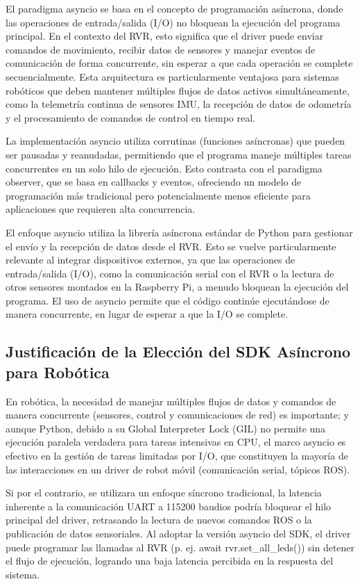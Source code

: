 \documentclass[11pt]{article}
\numberwithin{figure}{section}
\numberwithin{table}{section}
\begin{document}
El paradigma asyncio se basa en el concepto de programación asíncrona, donde las operaciones de entrada/salida (I/O) no bloquean la ejecución del programa principal. En el contexto del RVR, esto significa que el driver puede enviar comandos de movimiento, recibir datos de sensores y manejar eventos de comunicación de forma concurrente, sin esperar a que cada operación se complete secuencialmente. Esta arquitectura es particularmente ventajosa para sistemas robóticos que deben mantener múltiples flujos de datos activos simultáneamente, como la telemetría continua de sensores IMU, la recepción de datos de odometría y el procesamiento de comandos de control en tiempo real.

La implementación asyncio utiliza corrutinas (funciones asíncronas) que pueden ser pausadas y reanudadas, permitiendo que el programa maneje múltiples tareas concurrentes en un solo hilo de ejecución. Esto contrasta con el paradigma observer, que se basa en callbacks y eventos, ofreciendo un modelo de programación más tradicional pero potencialmente menos eficiente para aplicaciones que requieren alta concurrencia.

El enfoque asyncio utiliza la librería asíncrona estándar de Python para gestionar el envío y la recepción de datos desde el RVR. Esto se vuelve particularmente relevante al integrar dispositivos externos, ya que las operaciones de entrada/salida (I/O), como la comunicación serial con el RVR o la lectura de otros sensores montados en la Raspberry Pi, a menudo bloquean la ejecución del programa. El uso de asyncio permite que el código continúe ejecutándose de manera concurrente, en lugar de esperar a que la I/O se complete.


\subsection{Justificación de la Elección del SDK Asíncrono para Robótica}

En robótica, la necesidad de manejar múltiples flujos de datos y comandos de manera concurrente (sensores, control y comunicaciones de red) es importante; y aunque Python, debido a su Global Interpreter Lock (GIL) no permite una ejecución paralela verdadera para tareas intensivas en CPU, el marco asyncio es efectivo en la gestión de tareas limitadas por I/O, que constituyen la mayoría de las interacciones en un driver de robot móvil (comunicación serial, tópicos ROS).

Si por el contrario, se utilizara un enfoque síncrono tradicional, la latencia inherente a la comunicación UART a 115200 baudios podría bloquear el hilo principal del driver, retrasando la lectura de nuevos comandos ROS o la publicación de datos sensoriales. Al adoptar la versión asyncio del SDK, el driver puede programar las llamadas al RVR (p. ej. await rvr.set\_all\_leds()) sin detener el flujo de ejecución, logrando una baja latencia percibida en la respuesta del sistema.
\end{document}

